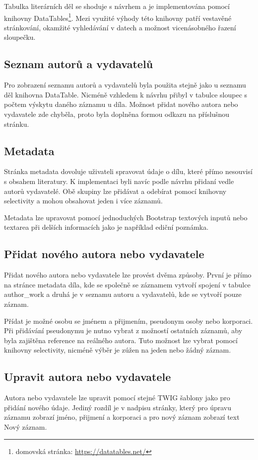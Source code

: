             Tabulka literárních děl se shoduje s návrhem a je implementována pomocí knihovny DataTables\footnote{domovská stránka: \url{https://datatables.net/}}. Mezi využité  výhody této knihovny patří vestavěné stránkování, okamžité vyhledávání v datech a možnost vicenásobného řazení sloupečku.
            
        \subsection{Seznam autorů a vydavatelů}
            Pro zobrazení seznamu autorů a vydavatelů byla použita stejně jako u seznamu děl knihovna DataTable. Nicméně vzhledem k návrhu přibyl v tabulce sloupec s počtem výskytu daného záznamu u díla. Možnost přidat nového autora nebo vydavatele zde chyběla, proto byla doplněna formou odkazu na příslušnou stránku.
        
        \subsection{Metadata}
            Stránka metadata dovoluje uživateli spravovat údaje o dílu, které přímo nesouvisí s obsahem literatury. K implementaci byli navíc podle návrhu přidaní vedle autorů vydavatelé. Obě skupiny lze přidávat a odebírat pomocí knihovny selectivity a mohou obsahovat jeden i více záznamů.
            
            Metadata lze upravovat pomocí jednoduchých Bootstrap textových inputů nebo textarea při delších informacích jako je například ediční poznámka.
            
        \subsection{Přidat nového autora nebo vydavatele}
            Přidat nového autora nebo vydavatele lze provést dvěma způsoby. První je přímo na stránce metadata díla, kde se společně se záznamem vytvoří spojení v tabulce author\_work a druhá je v seznamu autoru a vydavatelů, kde se vytvoří pouze záznam.
            
            Přídat je možné osobu se jménem a přijmením, pseudonym osoby nebo korporaci. Při přidávání pseudonymu je nutno vybrat z možností ostatních záznamů, aby byla zajištěna reference na reálného autora. Tuto možnost lze vybrat pomocí knihovny selectivity, nicméně výběr je zúžen na jeden nebo žádný záznam.
        
        \subsection{Upravit autora nebo vydavatele}
            Autora nebo vydavatele lze upravit pomocí stejné TWIG šablony jako pro přidání nového údaje. Jediný rozdíl je v nadpisu stránky, který pro úpravu záznamu zobrazí jméno, přijmení a korporaci a pro nový záznam zobrazí text Nový záznam.

